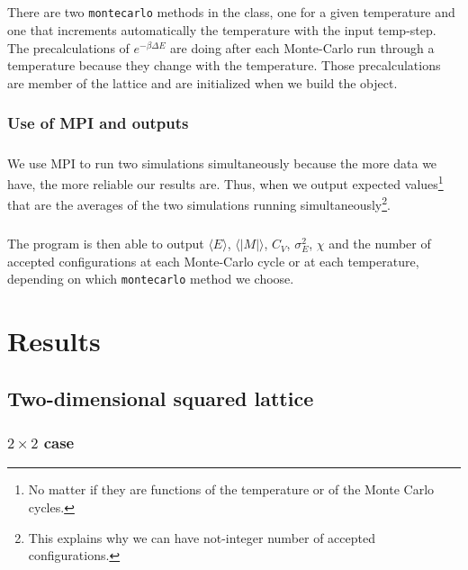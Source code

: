\documentclass[a4paper, twoside, 11pt]{report}
\theoremstyle{theorem}
\theoremstyle{remark}
\theoremstyle{exemple}
\begin{document}
        \paragraph{}There are two \texttt{montecarlo} methods in the class, one for a given temperature and one that increments automatically the temperature with the input temp-step. The precalculations of ${e}^{-\beta\Delta E}$ are doing after each Monte-Carlo run through a temperature because they change with the temperature. Those precalculations are member of the lattice and are initialized when we build the object.  
        
        \subsection{Use of MPI and outputs}
        
        	\paragraph{}We use MPI to run two simulations simultaneously because the more data we have, the more reliable our results are. Thus, when we output expected values\footnote{No matter if they are functions of the temperature or of the Monte Carlo cycles.} that are the averages of the two simulations running simultaneously\footnote{This explains why we can have not-integer number of accepted configurations.}.
	
			\paragraph{}The program is then able to output $\langle E \rangle$, $\langle |M| \rangle$, $C_V$, $\sigma_E^2$, $\chi$ and the number of accepted configurations at each Monte-Carlo cycle or at each temperature, depending on which \texttt{montecarlo} method we choose.


\chapter{Results}

    \section{Two-dimensional squared lattice}
    
        \subsection{$2\times2$ case}
        
\end{document}
